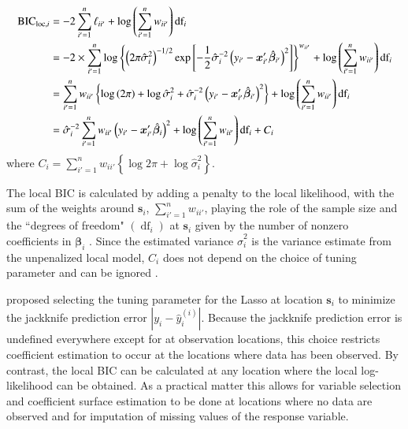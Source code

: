 \documentclass[authoryear, review, 11pt]{elsarticle}
\DeclareMathOperator*{\df}{\mbox{df}}
\begin{document}
	\begin{align}
		\mbox{BIC}_{\text{loc}, i} &= -2 \sum_{i'=1}^n \ell_{ii'}  + \log \left( \sum_{i'=1}^n w_{ii'} \right) \mbox{df}_i\notag\\
		&= -2 \times \sum_{i'=1}^n \log \left\{ \left(2 \pi \hat{\sigma}_i^2\right)^{-1/2} \exp \left[-\frac{1}{2} \hat{\sigma}_i^{-2} \left(y_{i'} - \bm{x}_{i'}' \hat{\bm{\beta}}_{i'} \right)^2\right] \right\}^{w_{ii'}} + \log \left( \sum_{i'=1}^n w_{ii'} \right) \mbox{df}_i\notag\\
		&= \sum_{i'=1}^n w_{ii'} \left\{ \log \left(2 \pi \right) + \log \hat{\sigma}_i^2 + \hat{\sigma}_i^{-2} \left(y_{i'} - \bm{x}_{i'}' \hat{\bm{\beta}}_{i'} \right)^2 \right\} + \log \left( \sum_{i'=1}^n w_{ii'} \right) \mbox{df}_i \notag\\
		&= \hat{\sigma}_i^{-2} \sum_{i'=1}^n w_{ii'} \left( y_{i'} - \bm{x}'_{i'} \hat{\bm{\beta}}_i \right)^2 + \log \left( \sum_{i'=1}^n w_{ii'} \right) \mbox{df}_i + C_i
	\end{align}
	where $C_i = \sum \limits_{i'=1}^n w_{ii'} \left\{\log{2\pi} + \log{\hat{\sigma}_i^2} \right\}$.
	
	 The local BIC is calculated by adding a penalty to the local likelihood, with the sum of the weights around $\bm{s}_i$, $\sum_{i'=1}^n w_{ii'}$, playing the role of the sample size and the ``degrees of freedom" $\left( \df_i \right)$ at $\bm{s}_i$ given by the number of nonzero coefficients in $\bm{\beta}_i$ \citep{Zou:2007}. Since the estimated variance $\hat{\sigma}_i^2$ is the variance estimate from the unpenalized local model, $C_i$ does not depend on the choice of tuning parameter and can be ignored \citep{Zou:2007}.
	
	\cite{Wheeler:2009} proposed selecting the tuning parameter for the Lasso at location $\bm{s}_i$ to minimize the jackknife prediction error $|y_i - \hat{y}_i^{(i)}|$. Because the jackknife prediction error is undefined everywhere except for at observation locations, this choice restricts coefficient estimation to occur at the locations where data has been observed. By contrast, the local BIC can be calculated at any location where the local log-likelihood can be obtained. As a practical matter this allows for variable selection and coefficient surface estimation to be done at locations where no data are observed and for imputation of missing values of the response variable.
	
\end{document}
